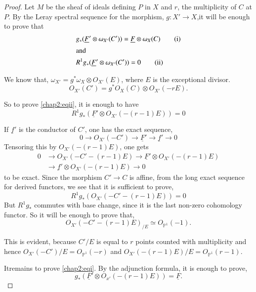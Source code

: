 \begin{proof}
Let $M$ be the sheaf of ideals defining $P$ in $X$ and $r$, the
multiplicity of $C$ at $P$. By the Leray spectral sequence for the
morphism, $g:X'\longrightarrow X$,\pageoriginale it will be enough to
prove that 
\begin{align*}
& g_*(\underline{F}'\otimes\omega_{X'}(C'))=\underline{F}\otimes
\omega_X (C)\tag{i}\label{chap2:eqi}\\
\intertext{and} 
&R^1g_*(\underline{F}'\otimes\omega_{X'}(C')) =
0\tag{ii}\label{chap2:eqii}
\end{align*}

We know that, $\omega_{X'}=g^*\omega_X\otimes O_{X'}(E)$, where $E$ is
the exceptional divisor.
$$
O_{X'}(C')=g^*O_X(C)\otimes O_{X'}(-rE).
$$

So to prove \eqref{chap2:eqii}, it is enough to have
\begin{equation*}
R^1g_*(\underline{F}'\otimes O_{X'}(-(r-1)E))=0\tag{ii}
\end{equation*}

If $\underline{f}'$ is the conductor of $C'$, one has the exact
sequence,
$$
0\longrightarrow O_{X'}(-C')\longrightarrow\underline{F}'
\longrightarrow\underline{f}'\longrightarrow 0
$$
Tensoring this by $O_{X'}(-(r-1)E)$, one gets
\begin{align*}
0&\longrightarrow O_{X'}(-C'-(r-1)E)\longrightarrow\underline{F}'
\otimes O_{X'}(-(r-1)E)\\
&\longrightarrow\underline{f}'\otimes O_{X'}
(-(r-1)E)\longrightarrow 0\tag{*}\label{chap2:eq*}
\end{align*}
to be exact. Since the morphism $C'\longrightarrow C$ is affine, from
the long exact sequence for derived functors, we see that it is
sufficient to prove,
\begin{equation*}
R^1g_*(O_{X'}(-C'-(r-1)E))=0\tag{iii}\label{chap2:eqiii}
\end{equation*}
But $R^1g_*$ commutes with base change, since it is the last non-zero
cohomology functor. So it will be enough to prove that,
$$
O_{X'}(-C'-(r-1)E)_{/E}\simeq O_{\mathbb{P}^1}(-1).
$$

This is evident, because $C'/E$ is equal to $r$ points counted with
multiplicity and hence $O_{X'}(-C')/E=O_{\mathbb{P}^1}(-r)$ and
$O_{X'}(-(r-1)E)/E=O_{\mathbb{P}^1}(r-1)$.

It\pageoriginale remains to prove \eqref{chap2:eqi}. By the adjunction
formula, it is enough to prove,
$$
g_*(\underline{F}'\otimes O_{x'}(-(r-1)E))=\underline{F}.
$$


\end{proof}
